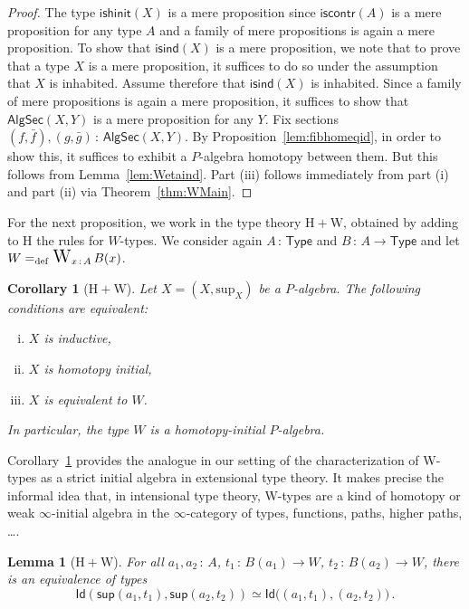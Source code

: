 \documentclass[10pt,a4paper,oneside,reqno]{amsart}
\theoremstyle{mythm}
\newtheorem{lemma}[theorem]{Lemma}
\newtheorem{corollary}[theorem]{Corollary}
\theoremstyle{mydef}
\theoremstyle{myrmk}
\newcommand{\defeq}{=_{\mathrm{def}}}
\newcommand{\co}{\,{:}\,}
\newcommand{\Hint}{\mathrm{H}}
\newcommand{\iscontr}{\mathsf{iscontr}}
\newcommand{\isalgind}{\mathsf{isind}}
\newcommand{\isalghinit}{\mathsf{ishinit}}
\newcommand{\Id}{\mathsf{Id}}
\newcommand{\W}{\mathrm{W}}
\DeclareMathOperator*{\WW}{\text{\Large $\mathrm{W}$}}
\newcommand{\wsup}{\mathsf{sup}}
\newcommand{\U}{\mathsf{Type}}
\renewcommand{\sup}{\mathrm{sup}}
\newcommand{\PalgSec}{\mathsf{AlgSec}}
\begin{document}
\begin{proof}
The type $\isalghinit(X)$ is a mere proposition since $\iscontr(A)$ is a mere proposition for any type $A$ and a family of mere propositions is again a mere proposition. To show that $\isalgind(X)$ is a mere proposition, we note that to prove that a type $X$ is a mere proposition, it suffices to do so under the assumption that $X$ is inhabited. Assume therefore that $\isalgind(X)$ is inhabited. Since a family of mere propositions is again a mere proposition, it suffices to show that $\PalgSec(X,Y)$ is a mere proposition for any $Y$. Fix sections 
$(f, \bar{f}), (g, \bar{g}) \co \PalgSec(X,Y)$. By Proposition~\ref{lem:fibhomeqid}, in order to show this, it suffices to exhibit a $P$-algebra homotopy between them. But this follows from Lemma~\ref{lem:Wetaind}. Part (iii) follows
immediately from part (i) and part (ii) via Theorem~\ref{thm:WMain}.
\end{proof}

For the next proposition, we work in the type theory $\Hint + \W$, obtained by adding to $\Hint$ the rules for $W$-types.
We consider again $A \co \U$ and $B \co A \to \U$ and let $W \defeq \WW_{x \co A} B(x)$.

\begin{corollary}[$\Hint + \W$]
\label{lem:WInitInt} Let $X = (X, \sup_X)$ be a $P$-algebra. The following conditions are
equivalent:
\begin{enumerate}[(i)]
\item $X$ is inductive,
\item $X$ is homotopy initial,
\item $X$ is equivalent to $W$.
\end{enumerate}
In particular, the type $W$ is a homotopy-initial $P$-algebra.
\end{corollary}


Corollary~\ref{lem:WInitInt} provides the analogue in our setting of the characterization of W-types as a strict initial algebra in extensional type theory. It makes precise the informal idea that, in intensional type theory, W-types are a kind of homotopy or weak $\infty$-initial algebra in the $\infty$-category of types, functions, paths, higher paths, \ldots.  

\begin{lemma}[$\Hint + \W$]\label{lem:suppath}
For all $a_1,a_2 \co A$, $t_1 \co B(a_1) \to W$, $t_2 \co B(a_2) \to W$, there is an equivalence of types
\[ 
\Id ( \wsup(a_1,t_1),  \wsup(a_2,t_2)  ) \simeq  \Id \big( (a_1,t_1), (a_2,t_2) \big) \, . 
\]
\end{lemma}
\end{document}
